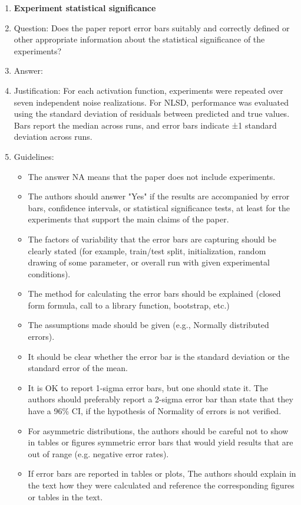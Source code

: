 \documentclass{article}
\begin{document}
\begin{enumerate}
\item {\bf Experiment statistical significance}
    \item[] Question: Does the paper report error bars suitably and correctly defined or other appropriate information about the statistical significance of the experiments?
    \item[] Answer: \answerYes{} %
    \item[] Justification: For each activation function, experiments were repeated over seven independent noise realizations. For NLSD, performance was evaluated using the standard deviation of residuals between predicted and true values. Bars report the median across runs, and error bars indicate ±1 standard deviation across runs.
    \item[] Guidelines:
    \begin{itemize}
        \item The answer NA means that the paper does not include experiments.
        \item The authors should answer "Yes" if the results are accompanied by error bars, confidence intervals, or statistical significance tests, at least for the experiments that support the main claims of the paper.
        \item The factors of variability that the error bars are capturing should be clearly stated (for example, train/test split, initialization, random drawing of some parameter, or overall run with given experimental conditions).
        \item The method for calculating the error bars should be explained (closed form formula, call to a library function, bootstrap, etc.)
        \item The assumptions made should be given (e.g., Normally distributed errors).
        \item It should be clear whether the error bar is the standard deviation or the standard error of the mean.
        \item It is OK to report 1-sigma error bars, but one should state it. The authors should preferably report a 2-sigma error bar than state that they have a 96\% CI, if the hypothesis of Normality of errors is not verified.
        \item For asymmetric distributions, the authors should be careful not to show in tables or figures symmetric error bars that would yield results that are out of range (e.g. negative error rates).
        \item If error bars are reported in tables or plots, The authors should explain in the text how they were calculated and reference the corresponding figures or tables in the text.
    \end{itemize}


\end{enumerate}
\end{document}
